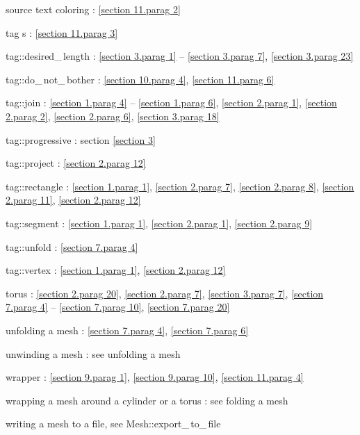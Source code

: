 \documentclass[a4paper]{scrreprt}
\def\numb{}
\newcommand\verm[1]{\textcolor{manif}{#1}}
\renewcommand\tt{\normalfont\ttfamily}
\begin{document}
\noindent
source text coloring : \ref{\numb section 11.\numb parag 2}

\noindent
{\small\tt\textcolor{tag}{tag}}\hskip0.5pt s : \ref{\numb section 11.\numb parag 3}
  
\noindent
{\small\tt\textcolor{tag}{tag}::desired\_\,length} :
\ref{\numb section 3.\numb parag 1} -- \ref{\numb section 3.\numb parag 7},
\ref{\numb section 3.\numb parag 23}

\noindent
{\small\tt\textcolor{tag}{tag}::do\_\,not\_\,bother} :
\ref{\numb section 10.\numb parag 4}, \ref{\numb section 11.\numb parag 6}

\noindent
{\small\tt\textcolor{tag}{tag}::join} :
\ref{\numb section 1.\numb parag 4} -- \ref{\numb section 1.\numb parag 6},
\ref{\numb section 2.\numb parag 1}, \ref{\numb section 2.\numb parag 2},
\ref{\numb section 2.\numb parag 6}, \ref{\numb section 3.\numb parag 18}

\noindent
{\small\tt\textcolor{tag}{tag}::progressive} : section \ref{\numb section 3}
  
\noindent
{\small\tt\textcolor{tag}{tag}::project} : \ref{\numb section 2.\numb parag 12}
  
\noindent
{\small\tt\textcolor{tag}{tag}::rectangle} : \ref{\numb section 1.\numb parag 1},
\ref{\numb section 2.\numb parag 7}, \ref{\numb section 2.\numb parag 8},
\ref{\numb section 2.\numb parag 11}, \ref{\numb section 2.\numb parag 12}

\noindent
{\small\tt\textcolor{tag}{tag}::segment} : \ref{\numb section 1.\numb parag 1}, 
\ref{\numb section 2.\numb parag 1}, \ref{\numb section 2.\numb parag 9}

\noindent
{\small\tt\textcolor{tag}{tag}::unfold} : \ref{\numb section 7.\numb parag 4}

\noindent
{\small\tt\textcolor{tag}{tag}::vertex} : \ref{\numb section 1.\numb parag 1},
\ref{\numb section 2.\numb parag 12}
  
\noindent
torus : \ref{\numb section 2.\numb parag 20}, \ref{\numb section 2.\numb parag 7},
\ref{\numb section 3.\numb parag 7},
\ref{\numb section 7.\numb parag 4} -- \ref{\numb section 7.\numb parag 10},
\ref{\numb section 7.\numb parag 20}

\noindent
unfolding a mesh : \ref{\numb section 7.\numb parag 4}, \ref{\numb section 7.\numb parag 6}

\noindent
unwinding a mesh : see unfolding a mesh

\noindent
wrapper : \ref{\numb section 9.\numb parag 1}, \ref{\numb section 9.\numb parag 10},
\ref{\numb section 11.\numb parag 4}

\noindent
wrapping a mesh around a cylinder or a torus : see folding a mesh

\noindent
writing a mesh to a file, see {\small\tt\verm{Mesh}::export\_\,to\_\,file}
\end{document}
